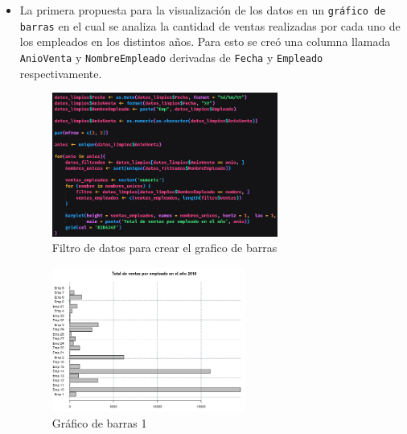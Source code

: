 \documentclass[12pt]{article}
\begin{document}
            \begin{itemize}
                \item La primera propuesta para la visualización de los datos en un \texttt{gráfico de barras} en el cual se analiza la cantidad de ventas realizadas por cada uno de los empleados en los distintos años. Para esto se creó una columna llamada \texttt{AnioVenta} y \texttt{NombreEmpleado} derivadas de \texttt{Fecha} y \texttt{Empleado} respectivamente.
                    \begin{figure}[h]
                        \centering 
                        \includegraphics[width=0.7\textwidth]{img/visualizacion-1.png}
                        \caption{Filtro de datos para crear el grafico de barras}
                    \end{figure}

                    \begin{figure}[h]
                        \centering 
                        \includegraphics[width=0.6\textwidth]{img/grafico-barras-1.png}
                        \caption{Gráfico de barras 1}
                    \end{figure}


\end{itemize}
\end{document}

